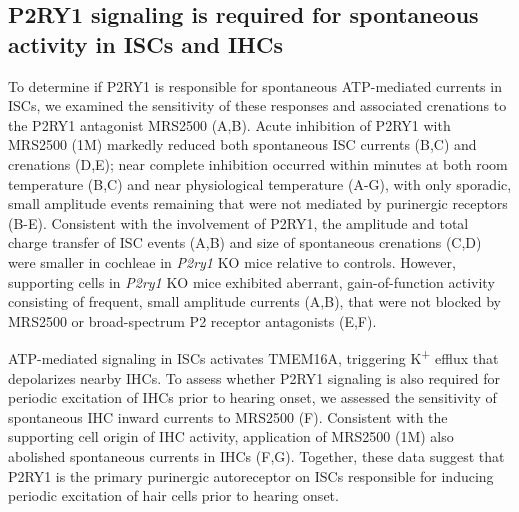 \documentclass[9pt,lineno]{elife}
\begin{document}
\subsection{P2RY1 signaling is required for spontaneous activity in ISCs and IHCs}
To determine if P2RY1 is responsible for spontaneous ATP-mediated currents in ISCs, we examined the sensitivity of these responses and associated crenations to the P2RY1 antagonist MRS2500 (A,B). Acute inhibition of P2RY1 with MRS2500 (1\textmu M) markedly reduced both spontaneous ISC currents (B,C) and crenations (D,E); near complete inhibition occurred within minutes at both room temperature (B,C) and near physiological temperature (A-G), with only sporadic, small amplitude events remaining that were not mediated by purinergic receptors (B-E). Consistent with the involvement of P2RY1, the amplitude and total charge transfer of ISC events (A,B) and size of spontaneous crenations (C,D) were smaller in cochleae in \textit{P2ry1} KO mice relative to controls. However, supporting cells in \textit{P2ry1} KO mice exhibited aberrant, gain-of-function activity consisting of frequent, small amplitude currents (A,B), that were not blocked by MRS2500 or broad-spectrum P2 receptor antagonists (E,F). 

ATP-mediated signaling in ISCs activates TMEM16A, triggering K\textsuperscript{+} efflux that depolarizes nearby IHCs. To assess whether P2RY1 signaling is also required for periodic excitation of IHCs prior to hearing onset, we assessed the sensitivity of spontaneous IHC inward currents to MRS2500 (F). Consistent with the supporting cell origin of IHC activity, application of MRS2500 (1\textmu M) also abolished spontaneous currents in IHCs (F,G). Together, these data suggest that P2RY1 is the primary purinergic autoreceptor on ISCs responsible for inducing periodic excitation of hair cells prior to hearing onset. 
\end{document}
